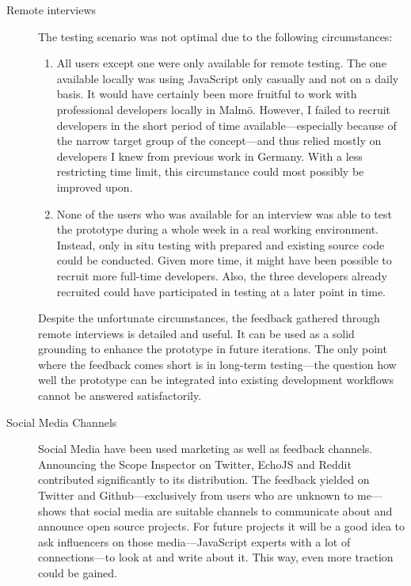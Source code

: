 \begin{description}
\item[Remote interviews]
The testing scenario was not optimal due to the following circumstances:

\begin{enumerate}
\def\labelenumi{\arabic{enumi}.}
\itemsep1pt\parskip0pt
\item
  All users except one were only available for remote testing. The one
  available locally was using JavaScript only casually and not on a
  daily basis. It would have certainly been more fruitful to work with
  professional developers locally in Malmö. However, I failed to recruit
  developers in the short period of time available—especially because of
  the narrow target group of the concept—and thus relied mostly on
  developers I knew from previous work in Germany. With a less
  restricting time limit, this circumstance could most possibly be
  improved upon.
\item
  None of the users who was available for an interview was able to test
  the prototype during a whole week in a real working environment.
  Instead, only in situ testing with prepared and existing source code
  could be conducted. Given more time, it might have been possible to
  recruit more full-time developers. Also, the three developers already
  recruited could have participated in testing at a later point in time.
\end{enumerate}

Despite the unfortunate circumstances, the feedback gathered through
remote interviews is detailed and useful. It can be used as a solid
grounding to enhance the prototype in future iterations. The only point
where the feedback comes short is in long-term testing—the question how
well the prototype can be integrated into existing development workflows
cannot be answered satisfactorily.
\item[Social Media Channels]
Social Media have been used marketing as well as feedback channels.
Announcing the Scope Inspector on Twitter, EchoJS and Reddit contributed
significantly to its distribution. The feedback yielded on Twitter and
Github—exclusively from users who are unknown to me—shows that social
media are suitable channels to communicate about and announce open
source projects. For future projects it will be a good idea to ask
influencers on those media—JavaScript experts with a lot of
connections—to look at and write about it. This way, even more traction
could be gained.
\end{description}

